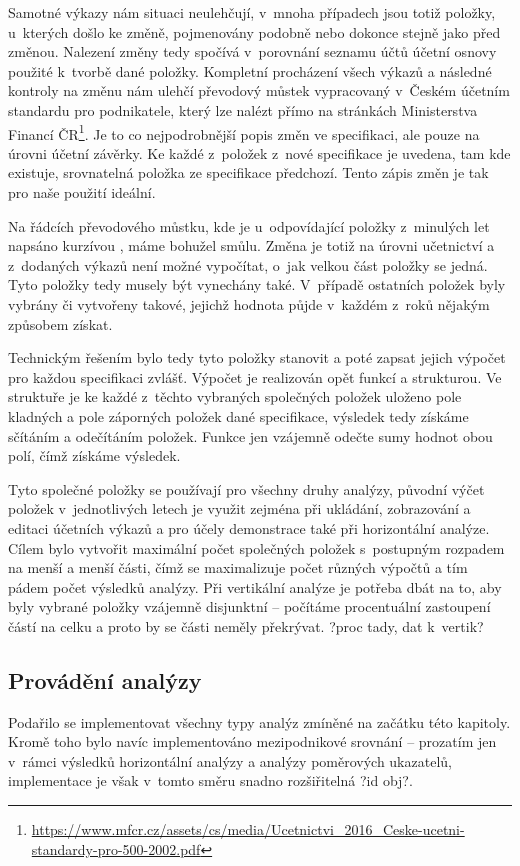 Samotné výkazy nám situaci neulehčují, v~mnoha případech jsou totiž položky, u~kterých došlo ke změně, pojmenovány podobně nebo dokonce stejně jako před změnou. Nalezení změny tedy spočívá v~porovnání seznamu účtů účetní osnovy použité k~tvorbě dané položky. Kompletní procházení všech výkazů a následné kontroly na změnu nám ulehčí převodový můstek vypracovaný v~Českém účetním standardu pro podnikatele, který lze nalézt přímo na stránkách Ministerstva Financí ČR\footnote{\url{https://www.mfcr.cz/assets/cs/media/Ucetnictvi\_2016\_Ceske-ucetni-standardy-pro-500-2002.pdf}}. Je to co nejpodrobnější popis změn ve specifikaci, ale pouze na úrovni účetní závěrky. Ke každé z~položek z~nové specifikace je uvedena, tam kde existuje, srovnatelná položka ze specifikace předchozí. Tento zápis změn je tak pro naše použití ideální.

Na řádcích převodového můstku, kde je u~odpovídající položky z~minulých let napsáno kurzívou , máme bohužel smůlu. Změna je totiž na úrovni učetnictví a z~dodaných výkazů není možné vypočítat, o~jak velkou část položky se jedná. Tyto položky tedy musely být vynechány také. V~případě ostatních položek byly vybrány či vytvořeny takové, jejichž hodnota půjde v~každém z~roků nějakým způsobem získat. 

Technickým řešením bylo tedy tyto položky stanovit a poté zapsat jejich výpočet pro každou specifikaci zvlášť. Výpočet je realizován opět funkcí a strukturou. Ve struktuře je ke každé z~těchto vybraných společných položek uloženo pole kladných a pole záporných položek dané specifikace, výsledek tedy získáme sčítáním a odečítáním položek. Funkce jen vzájemně odečte sumy hodnot obou polí, čímž získáme výsledek.

Tyto společné položky se používají pro všechny druhy analýzy, původní výčet položek v~jednotlivých letech je využit zejména při ukládání, zobrazování a editaci účetních výkazů a pro účely demonstrace také při horizontální analýze. Cílem bylo vytvořit maximální počet společných položek s~postupným rozpadem na menší a menší části, čímž se maximalizuje počet různých výpočtů a tím pádem počet výsledků analýzy. Při vertikální analýze je potřeba dbát na to, aby byly vybrané položky vzájemně disjunktní -- počítáme procentuální zastoupení částí na celku a proto by se části neměly překrývat. ?proc tady, dat k~vertik?


\subsection{Provádění analýzy}
Podařilo se implementovat všechny typy analýz zmíněné na začátku této kapitoly. Kromě toho bylo navíc implementováno mezipodnikové srovnání -- prozatím jen v~rámci výsledků horizontální analýzy a analýzy poměrových ukazatelů, implementace je však v~tomto směru snadno rozšiřitelná ?id obj?. 

